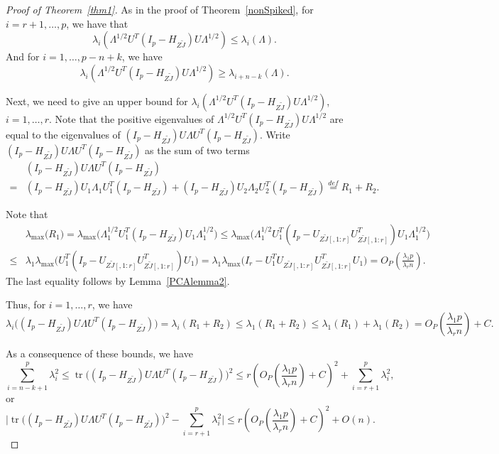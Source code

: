 \documentclass[review]{elsarticle}
\DeclareMathOperator{\mytr}{tr}
\theoremstyle{plain}
\theoremstyle{definition}
\theoremstyle{remark}
\begin{document}
\begin{proof}[\textrm{Proof of Theorem~\ref{thm1}}]
    As in the proof of Theorem~\ref{nonSpiked}, for $i=r+1,\ldots, p$, we have  that
    \begin{equation}
    \lambda_i (\Lambda^{1/2}U^T (I_p-H_{Z\tilde{J}})U\Lambda^{1/2})\leq
    \lambda_i (\Lambda).
    \end{equation}
     And for $i=1,\ldots, p-n+k$, we have
    \begin{equation}
    \lambda_i (\Lambda^{1/2}U^T (I_p-H_{Z\tilde{J}})U\Lambda^{1/2})\geq
    \lambda_{i+n-k} (\Lambda).
    \end{equation}

    Next, we need to give an upper bound for $\lambda_i(\Lambda^{1/2}U^T (I_p-H_{Z\tilde{J}})U\Lambda^{1/2})$, $i=1,\ldots,r$.
    Note that the positive eigenvalues of $\Lambda^{1/2}U^T (I_p-H_{Z\tilde{J}})U\Lambda^{1/2}$ are equal to the eigenvalues of $(I_p-H_{Z\tilde{J}})U\Lambda U^T (I_p-H_{Z\tilde{J}})$.
Write $(I_p-H_{Z\tilde{J}})U\Lambda U^T (I_p-H_{Z\tilde{J}})$ as the sum of two terms
$$
\begin{aligned}
&(I_p-H_{Z\tilde{J}})U\Lambda U^T (I_p-H_{Z\tilde{J}})
\\
=&
(I_p-H_{Z\tilde{J}})U_1\Lambda_1 U_1^T(I_p-H_{Z\tilde{J}})+(I_p-H_{Z\tilde{J}})U_2\Lambda_2 U_2^T (I_p-H_{Z\tilde{J}})
\overset{def}{=}R_1+R_2.
\end{aligned}
$$

Note that
$$
\begin{aligned}
&\lambda_{\max}\big( R_1 \big)
=
\lambda_{\max}\big(\Lambda_1^{1/2} U_1^T(I_p-H_{Z\tilde{J}}) U_1 \Lambda_1^{1/2}\big)
\leq 
\lambda_{\max}\big(\Lambda_1^{1/2} U_1^T(I_p-U_{Z\tilde{J}[,1:r]}U_{Z\tilde{J}[,1:r]}^T) U_1 \Lambda_1^{1/2}\big)\\
\leq &
\lambda_1
\lambda_{\max}\big(U_1^T(I_p-U_{Z\tilde{J}[,1:r]}U_{Z\tilde{J}[,1:r]}^T) U_1 \big)
= 
\lambda_1
\lambda_{\max}\big(I_r - U_1^TU_{Z\tilde{J}[,1:r]}U_{Z\tilde{J}[,1:r]}^T U_1 \big)=O_P(\frac{\lambda_1 p}{\lambda_r n}).
\end{aligned}
$$
    The last equality follows by Lemma~\ref{PCAlemma2}.

Thus, for $i=1,\ldots, r$, we have
$$
    \lambda_i\big((I_p-H_{Z\tilde{J}})U\Lambda U^T (I_p-H_{Z\tilde{J}})\big)=
\lambda_i(R_1+R_2)\leq
\lambda_1(R_1+R_2)\leq \lambda_1(R_1)+\lambda_1(R_2)= O_P(\frac{\lambda_1 p}{\lambda_r n}) + C.
$$

As a consequence of these bounds, we have
$$
    \sum_{i=n-k+1}^p \lambda_i^2\leq \mytr\big((I_p-H_{Z\tilde{J}})U\Lambda U^T (I_p-H_{Z\tilde{J}})\big)^2 \leq  r(O_P(\frac{\lambda_1 p}{\lambda_r n})+C)^2+\sum_{i=r+1}^p \lambda_i^2,
$$
or
    \begin{equation}\label{eq:spiketrace1}
    \big|\mytr\big((I_p-H_{Z\tilde{J}})U\Lambda U^T (I_p-H_{Z\tilde{J}})\big)^2 - \sum_{i=r+1}^p \lambda_i^2 \big|\leq 
    r(O_P(\frac{\lambda_1 p}{\lambda_r n})+C)^2+O(n).
    \end{equation}


\end{proof}
\end{document}
